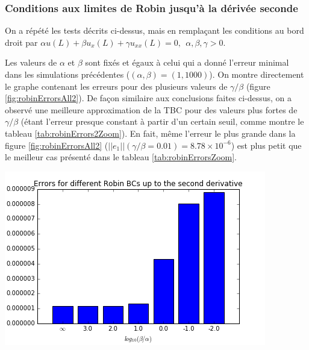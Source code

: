 \subsubsection{Conditions aux limites de Robin jusqu'à la dérivée seconde}

\indent On a répété les tests décrits ci-dessus, mais en remplaçant les conditions au bord droit par $\alpha u(L) + \beta u_x(L) + \gamma u_{xx}(L) = 0,  \ \ \alpha,\beta, \gamma > 0$.

\indent Les valeurs de $\alpha$ et $\beta$ sont fixés et égaux à celui qui a donné l'erreur minimal dans les simulations précédentes ($(\alpha,\beta) = (1,1000)$). On montre directement le graphe contenant les erreurs pour des plusieurs valeurs de $\gamma/\beta$ (figure \ref{fig:robinErrorsAll2}). De façon similaire aux conclusions faites ci-dessus, on a observé une meilleure approximation de la TBC pour des valeurs plus fortes de $\gamma/\beta$ (étant l'erreur presque constant à partir d'un certain seuil, comme montre le tableau \ref{tab:robinErrors2Zoom}). En fait, même l'erreur le plus grande dans la figure \ref{fig:robinErrorsAll2} ($||e_1||(\gamma/\beta = 0.01) = 8.78 \times 10^{-6}$) est plus petit que le meilleur cas présenté dans le tableau \ref{tab:robinErrorsZoom}.

\begingroup
\begin{center}
		\includegraphics[scale=.6]{figures/robinErrors2.png}
\end{center}
\endgroup


